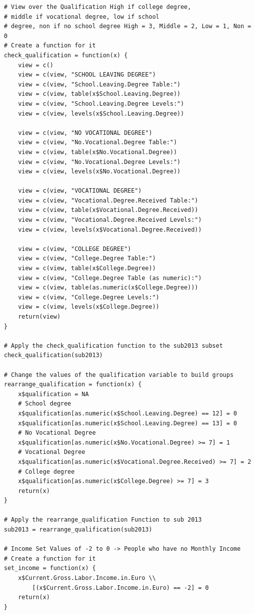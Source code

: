 \documentclass[a4paper]{article}
\begin{document}
{\begin{lstlisting}
# View over the Qualification High if college degree, 
# middle if vocational degree, low if school
# degree, non if no school degree High = 3, Middle = 2, Low = 1, Non = 0 
# Create a function for it
check_qualification = function(x) {
    view = c()
    view = c(view, "SCHOOL LEAVING DEGREE")
    view = c(view, "School.Leaving.Degree Table:")
    view = c(view, table(x$School.Leaving.Degree))
    view = c(view, "School.Leaving.Degree Levels:")
    view = c(view, levels(x$School.Leaving.Degree))
    
    view = c(view, "NO VOCATIONAL DEGREE")
    view = c(view, "No.Vocational.Degree Table:")
    view = c(view, table(x$No.Vocational.Degree))
    view = c(view, "No.Vocational.Degree Levels:")
    view = c(view, levels(x$No.Vocational.Degree))
    
    view = c(view, "VOCATIONAL DEGREE")
    view = c(view, "Vocational.Degree.Received Table:")
    view = c(view, table(x$Vocational.Degree.Received))
    view = c(view, "Vocational.Degree.Received Levels:")
    view = c(view, levels(x$Vocational.Degree.Received))
    
    view = c(view, "COLLEGE DEGREE")
    view = c(view, "College.Degree Table:")
    view = c(view, table(x$College.Degree))
    view = c(view, "College.Degree Table (as numeric):")
    view = c(view, table(as.numeric(x$College.Degree)))
    view = c(view, "College.Degree Levels:")
    view = c(view, levels(x$College.Degree))
    return(view)
}

# Apply the check_qualification function to the sub2013 subset
check_qualification(sub2013)

# Change the values of the qualification variable to build groups
rearrange_qualification = function(x) {
    x$qualification = NA
    # School degree
    x$qualification[as.numeric(x$School.Leaving.Degree) == 12] = 0
    x$qualification[as.numeric(x$School.Leaving.Degree) == 13] = 0
    # No Vocational Degree
    x$qualification[as.numeric(x$No.Vocational.Degree) >= 7] = 1
    # Vocational Degree
    x$qualification[as.numeric(x$Vocational.Degree.Received) >= 7] = 2
    # College degree
    x$qualification[as.numeric(x$College.Degree) >= 7] = 3
    return(x)
}

# Apply the rearrange_qualification Function to sub 2013
sub2013 = rearrange_qualification(sub2013)

# Income Set Values of -2 to 0 -> People who have no Monthly Income 
# Create a function for it
set_income = function(x) {
    x$Current.Gross.Labor.Income.in.Euro \\ 
    	[(x$Current.Gross.Labor.Income.in.Euro) == -2] = 0
    return(x)
}


\end{lstlisting}}
\end{document}
